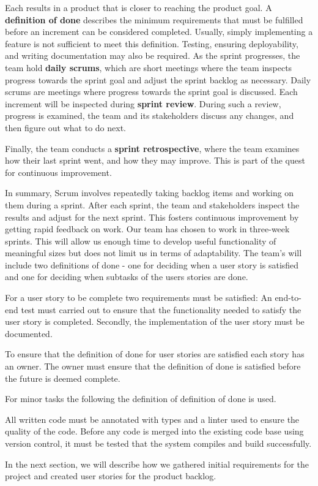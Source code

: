 Each results in a product that is closer to reaching the product goal.
A \textbf{definition of done} describes the minimum requirements that must be fulfilled before an increment can be considered completed.
Usually, simply implementing a feature is not sufficient to meet this definition.
Testing, ensuring deployability, and writing documentation may also be required.
As the sprint progresses, the team hold \textbf{daily scrums}, which are short meetings where the team inspects progress towards the sprint goal and adjust the sprint backlog as necessary.
Daily scrums are meetings where progress towards the sprint goal is discussed.
Each increment will be inspected during \textbf{sprint review}.
During such a review, progress is examined, the team and its stakeholders discuss any changes, and then figure out what to do next.

Finally, the team conducts a \textbf{sprint retrospective}, where the team examines how their last sprint went, and how they may improve.
This is part of the quest for continuous improvement.\cite{sutherlandScrumArtDoing2014}

In summary, Scrum involves repeatedly taking backlog items and working on them during a sprint.
After each sprint, the team and stakeholders inspect the results and adjust for the next sprint.
This fosters continuous improvement by getting rapid feedback on work.
Our team has chosen to work in three-week sprints.
This will allow us enough time to develop useful functionality of meaningful sizes but does not limit us in terms of adaptability.
The team's will include two definitions of done - one for deciding when a user story is satisfied and one for deciding when subtasks of the users stories are done.
\begin{dod}
    For a user story to be complete two requirements must be satisfied: An end-to-end test must carried out to ensure that the functionality needed to satisfy the user story is completed. Secondly, the implementation of the user story must be documented. 
\end{dod}
To ensure that the definition of done for user stories are satisfied each story has an owner. 
The owner must ensure that the definition of done is satisfied before the future is deemed complete.

For minor tasks the following the definition of definition of done is used. 
\begin{dod}
    All written code must be annotated with types and a linter used to ensure the quality of the code.
    Before any code is merged into the existing code base using version control, it must be tested that the system compiles and build successfully.  
\end{dod}

In the next section, we will describe how we gathered initial requirements for the project and created user stories for the product backlog.